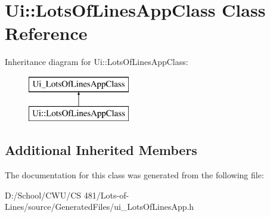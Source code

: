\hypertarget{class_ui_1_1_lots_of_lines_app_class}{}\section{Ui\+:\+:Lots\+Of\+Lines\+App\+Class Class Reference}
\label{class_ui_1_1_lots_of_lines_app_class}
Inheritance diagram for Ui\+:\+:Lots\+Of\+Lines\+App\+Class\+:\begin{figure}[H]
\begin{center}
\leavevmode
\includegraphics[height=2.000000cm]{class_ui_1_1_lots_of_lines_app_class}
\end{center}
\end{figure}
\subsection*{Additional Inherited Members}


The documentation for this class was generated from the following file\+:\begin{DoxyCompactItemize}
\item 
D\+:/\+School/\+C\+W\+U/\+C\+S 481/\+Lots-\/of-\/\+Lines/source/\+Generated\+Files/ui\+\_\+\+Lots\+Of\+Lines\+App.\+h\end{DoxyCompactItemize}
